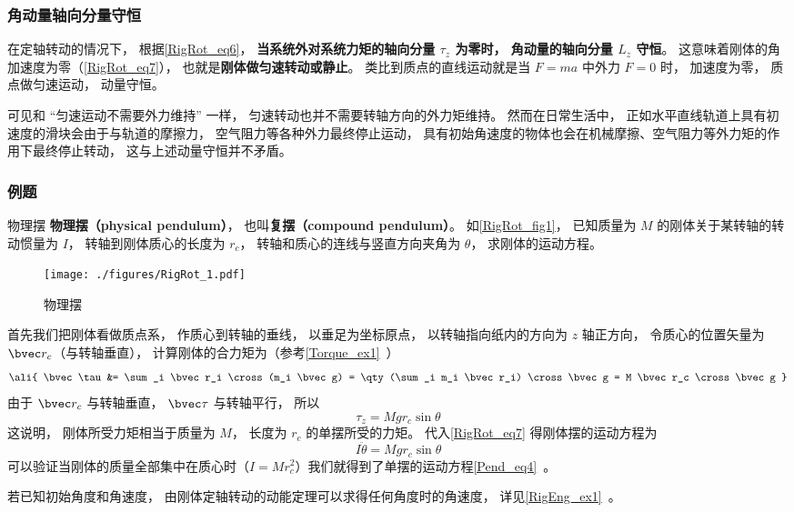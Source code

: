 \subsubsection{角动量轴向分量守恒}
在定轴转动的情况下， 根据\autoref{RigRot_eq6}， \textbf{当系统外对系统力矩的轴向分量 $\tau_z$ 为零时， 角动量的轴向分量 $L_z$ 守恒}。  这意味着刚体的角加速度为零（\autoref{RigRot_eq7}）， 也就是\textbf{刚体做匀速转动或静止}。 类比到质点的直线运动就是当 $F = ma$ 中外力 $F = 0$ 时， 加速度为零， 质点做匀速运动， 动量守恒。

可见和 “匀速运动不需要外力维持” 一样， 匀速转动也并不需要转轴方向的外力矩维持。 然而在日常生活中， 正如水平直线轨道上具有初速度的滑块会由于与轨道的摩擦力， 空气阻力等各种外力最终停止运动， 具有初始角速度的物体也会在机械摩擦、空气阻力等外力矩的作用下最终停止转动， 这与上述动量守恒并不矛盾。

\subsubsection{例题}

\begin{example}{物理摆}\label{RigRot_ex1}
\textbf{物理摆（physical pendulum）}， 也叫\textbf{复摆（compound pendulum）}。 如\autoref{RigRot_fig1}， 已知质量为 $M$ 的刚体关于某转轴的转动惯量为 $I$， 转轴到刚体质心的长度为 $r_c$， 转轴和质心的连线与竖直方向夹角为 $\theta$， 求刚体的运动方程。
\begin{figure}[ht]
\centering
\texttt{[image: ./figures/RigRot\_1.pdf]}
\caption{物理摆} \label{RigRot_fig1}
\end{figure}

首先我们把刚体看做质点系， 作质心到转轴的垂线， 以垂足为坐标原点， 以转轴指向纸内的方向为 $z$ 轴正方向， 令质心的位置矢量为 $\bvec r_c$（与转轴垂直）， 计算刚体的合力矩为（参考\autoref{Torque_ex1}~）
\begin{equation}\label{RigRot_eq14}\ali{
\bvec \tau &= \sum_i \bvec r_i \cross (m_i \bvec g)
= \qty(\sum_i m_i \bvec r_i) \cross \bvec g
= M \bvec r_c \cross \bvec g
}\end{equation}
由于 $\bvec r_c$ 与转轴垂直， $\bvec \tau$ 与转轴平行， 所以
\begin{equation}
\tau_z = Mg r_c \sin\theta
\end{equation}
这说明， 刚体所受力矩相当于质量为 $M$， 长度为 $r_c$ 的单摆所受的力矩。 代入\autoref{RigRot_eq7} 得刚体摆的运动方程为
\begin{equation}
I\ddot \theta = Mg r_c \sin\theta
\end{equation}
可以验证当刚体的质量全部集中在质心时（$I = Mr_c^2$）我们就得到了单摆的运动方程\autoref{Pend_eq4}~。

若已知初始角度和角速度， 由刚体定轴转动的动能定理可以求得任何角度时的角速度， 详见\autoref{RigEng_ex1}~。
\end{example}

